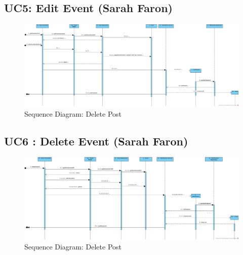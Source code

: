 \documentclass{article}
\begin{document}
\subsection{UC5: Edit Event (Sarah Faron)}
\begin{figure}[H]
    \centering
    \includegraphics[width=.98\textwidth]{images/SD - UC05 - Edit Event.png}
    \centering
    \caption{Sequence Diagram: Delete Post}
\end{figure}
\subsection{UC6 : Delete Event (Sarah Faron)}
\begin{figure}[H]
    \centering
    \includegraphics[width=.98\textwidth]{images/SD - UC06 - Delete Event.png}
    \centering
    \caption{Sequence Diagram: Delete Post}
\end{figure}
\end{document}

